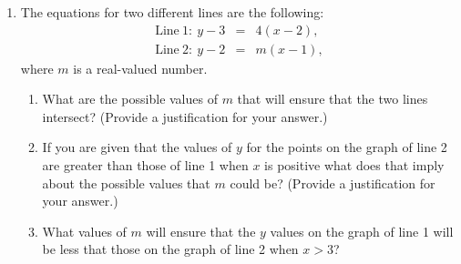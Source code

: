 \begin{enumerate}
\clearpage

\item The equations for two different lines are the
  following:
  \begin{eqnarray*}
    \mathrm{Line~1:~} y-3 & = & 4 (x-2), \\
    \mathrm{Line~2:~} y-2 & = & m (x-1),
  \end{eqnarray*}
  where $m$ is a real-valued number.

  \begin{enumerate}
  \item What are the possible values of $m$ that will ensure that the
    two lines intersect? (Provide a justification for your answer.)

    \vfill
  
  \item If you are given that the values of $y$ for the points on the
    graph of line 2 are greater than those of line 1 when $x$ is positive
    what does that imply about the possible values that $m$ could be?
    (Provide a justification for your answer.)

    \vfill

  \item What values of $m$ will ensure that the $y$ values on the
    graph of line 1 will be less that those on the graph of line 2
    when $x>3$?

    \vfill

  \end{enumerate}



\end{enumerate}




